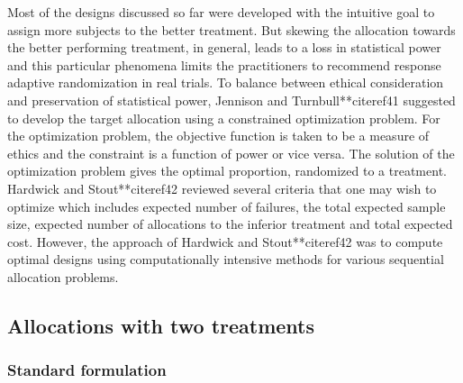 Most of the designs discussed so far were developed with the intuitive goal to assign more subjects to the better treatment. But skewing the allocation towards the better performing treatment, in general,  leads to a loss in statistical power and this particular phenomena limits the practitioners  to recommend response adaptive randomization in real trials. To balance between ethical consideration and preservation of statistical power, Jennison and Turnbull**citeref{41} suggested to develop the target allocation using a constrained optimization problem.  For the optimization problem, the objective function is taken to be a measure of ethics and the constraint is a function of power or vice versa. The solution of the optimization problem gives the optimal proportion, randomized to a treatment. Hardwick and Stout**citeref{42} reviewed several criteria that one may wish to optimize which includes  expected number of failures, the total expected sample size, expected number of allocations to the inferior treatment and total expected cost. However, the approach of  Hardwick and Stout**citeref{42} was to compute optimal designs using computationally intensive methods for various sequential allocation problems.

\subsection{Allocations with two treatments}

\subsubsection{Standard formulation}

